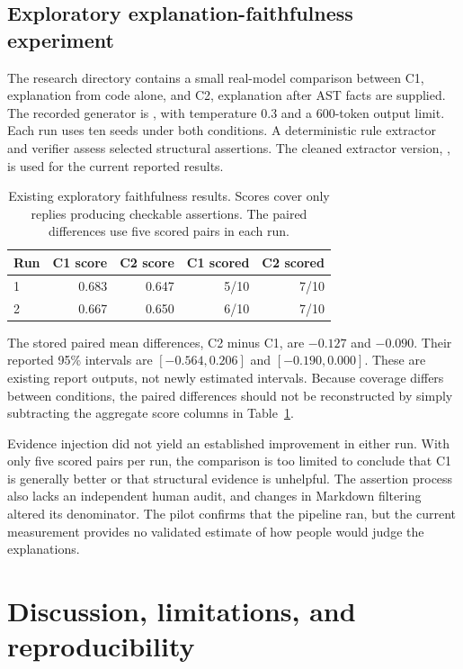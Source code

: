 \subsection{Exploratory explanation-faithfulness experiment}
\label{sec:faithfulness}
The research directory contains a small real-model comparison between C1, explanation from code alone, and C2, explanation after AST facts are supplied. The recorded generator is , with temperature 0.3 and a 600-token output limit. Each run uses ten seeds under both conditions. A deterministic rule extractor and verifier assess selected structural assertions. The cleaned extractor version, , is used for the current reported results.

\begin{table}[htbp]
\centering\footnotesize
\caption{Existing exploratory faithfulness results. Scores cover only replies producing checkable assertions. The paired differences use five scored pairs in each run.}
\label{tab:faithfulness}
\begin{tabular}{lrrrr}
\toprule
Run & C1 score & C2 score & C1 scored & C2 scored\\
\midrule
1 & 0.683 & 0.647 & 5/10 & 7/10\\
2 & 0.667 & 0.650 & 6/10 & 7/10\\
\bottomrule
\end{tabular}
\end{table}

The stored paired mean differences, C2 minus C1, are $-0.127$ and $-0.090$. Their reported 95\% intervals are $[-0.564,0.206]$ and $[-0.190,0.000]$. These are existing report outputs, not newly estimated intervals. Because coverage differs between conditions, the paired differences should not be reconstructed by simply subtracting the aggregate score columns in Table~\ref{tab:faithfulness}.

Evidence injection did not yield an established improvement in either run. With only five scored pairs per run, the comparison is too limited to conclude that C1 is generally better or that structural evidence is unhelpful. The assertion process also lacks an independent human audit, and changes in Markdown filtering altered its denominator. The pilot confirms that the pipeline ran, but the current measurement provides no validated estimate of how people would judge the explanations.

\section{Discussion, limitations, and reproducibility}
